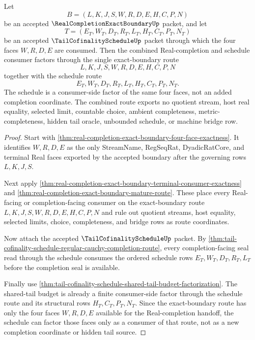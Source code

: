 \begin{theorem}
\label{thm:real-completion-exact-boundary-tail-cofinality-schedule-factorization}
Let
$$
B=(L,K,J,S,W,R,D,E,H,C,P,N)
$$
be an accepted $\RealCompletionExactBoundaryUp$ packet, and let
$$
T=(E_T,W_T,D_T,R_T,L_T,H_T,C_T,P_T,N_T)
$$
be an accepted $\TailCofinalityScheduleUp$ packet through which the four faces $W,R,D,E$ are consumed. Then the combined Real-completion and schedule consumer factors through the single exact-boundary route
$$
L,K,J,S,W,R,D,E,H,C,P,N
$$
together with the schedule route
$$
E_T,W_T,D_T,R_T,L_T,H_T,C_T,P_T,N_T.
$$
The schedule is a consumer-side factor of the same four faces, not an added completion coordinate. The combined route exports no quotient stream, host real equality, selected limit, countable choice, ambient completeness, metric-completeness, hidden tail oracle, unbounded schedule, or machine bridge row.
\end{theorem}
\begin{proof}
Start with \autoref{thm:real-completion-exact-boundary-four-face-exactness}. It identifies $W,R,D,E$ as the only StreamName, RegSeqRat, DyadicRatCore, and terminal Real faces exported by the accepted boundary after the governing rows $L,K,J,S$.

Next apply \autoref{thm:real-completion-exact-boundary-terminal-consumer-exactness} and \autoref{thm:real-completion-exact-boundary-mature-route}. These place every Real-facing or completion-facing consumer on the exact-boundary route $L,K,J,S,W,R,D,E,H,C,P,N$ and rule out quotient streams, host equality, selected limits, choice, completeness, and bridge rows as route coordinates.

Now attach the accepted $\TailCofinalityScheduleUp$ packet. By \autoref{thm:tail-cofinality-schedule-regular-cauchy-completion-route}, every completion-facing seal read through the schedule consumes the ordered schedule rows $E_T,W_T,D_T,R_T,L_T$ before the completion seal is available.

Finally use \autoref{thm:tail-cofinality-schedule-shared-tail-budget-factorization}. The shared-tail budget is already a finite consumer-side factor through the schedule route and its structural rows $H_T,C_T,P_T,N_T$. Since the exact-boundary route has only the four faces $W,R,D,E$ available for the Real-completion handoff, the schedule can factor those faces only as a consumer of that route, not as a new completion coordinate or hidden tail source.
\end{proof}

